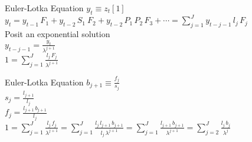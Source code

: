 \documentclass{beamer}
\begin{document}
\begin{frame}{Euler-Lotka Equation}
  $y_t \equiv z_t[1]$\\
  \vspace{.5cm}
  $y_t = y_{t-1} \, F_1 + y_{t-2} \, S_1 \ F_2 + y_{t-2} \, P_1 \, P_2 \, F_3 + \cdots = \displaystyle\sum\limits_{j=1}^{J} y_{t-j-1} \, l_j \, F_j$\\
  \vspace{.5cm}
  Posit an exponential solution\\
  \vspace{.5cm}
  $y_{t-j-1} = \frac{y_t}{\lambda^{j+1}}$\\
  \vspace{.5cm}
  $1 = \displaystyle\sum\limits_{j=1}^{J} \frac{l_j \, F_j}{\lambda^{j+1}}$\\
\end{frame}

\begin{frame}{Euler-Lotka Equation}
  \vspace{.5cm}
  $b_{j+1} \equiv \frac{f_j}{s_j}$\\
  \vspace{.5cm}
  $s_{j} = \frac{l_{j+1}}{l_j}$\\
  \vspace{.5cm}
  $f_j = \frac{l_{j+1} \, b_{j+1}}{l_j}$\\
  \vspace{.5cm}
  $1 = \displaystyle\sum\limits_{j=1}^{J} \frac{l_j \, f_j}{\lambda^{j+1}} = \displaystyle\sum\limits_{j=1}^{J} \frac{l_j \, l_{j+1} \, b_{j+1}}{l_j \, \lambda^{j+1}} = \displaystyle\sum\limits_{j=1}^{J} \frac{l_{j+1} \, b_{j+1}}{\lambda^{j+1}} = \displaystyle\sum\limits_{j=2}^{J} \frac{l_j \, b_j}{\lambda^j}$\\
  \vspace{.5cm}
\end{frame}
\end{document}
